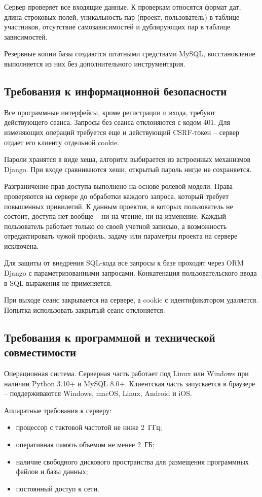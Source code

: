 Сервер проверяет все входящие данные. К проверкам относятся формат дат, длина строковых полей, уникальность пар (проект, пользователь) в таблице участников, отсутствие самозависимостей и дублирующих пар в таблице зависимостей.

Резервные копии базы создаются штатными средствами MySQL, восстановление выполняется из них без дополнительного инструментария.

\subsection{Требования к информационной безопасности}

Все программные интерфейсы, кроме регистрации и входа, требуют действующего сеанса. Запросы без сеанса отклоняются с кодом 401. Для изменяющих операций требуется еще и действующий CSRF-токен -- сервер отдает его клиенту отдельной cookie.

Пароли хранятся в виде хеша, алгоритм выбирается из встроенных механизмов Django. При входе сравниваются хеши, открытый пароль нигде не сохраняется.

Разграничение прав доступа выполнено на основе ролевой модели. Права проверяются на сервере до обработки каждого запроса, который требует повышенных привилегий. К данным проектов, в которых пользователь не состоит, доступа нет вообще -- ни на чтение, ни на изменение. Каждый пользователь работает только со своей учетной записью, а возможность отредактировать чужой профиль, задачу или параметры проекта на сервере исключена.

Для защиты от внедрения SQL-кода \cite{owasp_top10, art_web_security} все запросы к базе проходят через ORM Django с параметризованными запросами. Конкатенация пользовательского ввода в SQL-выражения не применяется.

При выходе сеанс закрывается на сервере, а cookie с идентификатором удаляется. Попытка использовать закрытый сеанс отклоняется.

\subsection{Требования к программной и технической совместимости}

Операционная система. Серверная часть работает под Linux или Windows при наличии Python 3.10+ и MySQL 8.0+. Клиентская часть запускается в браузере -- поддерживаются Windows, macOS, Linux, Android и iOS.

Аппаратные требования к серверу:
\begin{itemize}
    \item процессор с тактовой частотой не ниже 2~ГГц;
    \item оперативная память объемом не менее 2~ГБ;
    \item наличие свободного дискового пространства для размещения программных файлов и базы данных;
    \item постоянный доступ к сети.
\end{itemize}

